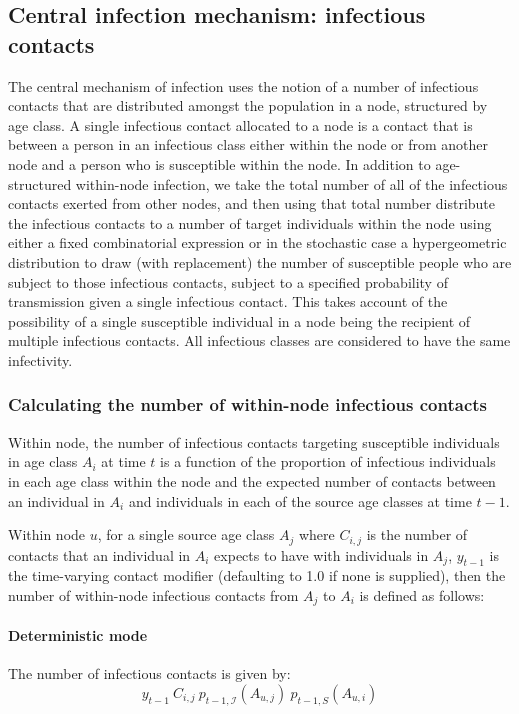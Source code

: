 \documentclass[11pt]{article}
\begin{document}
\subsection{Central infection mechanism: infectious contacts }

The central mechanism of infection uses the notion of a number of infectious contacts that are distributed amongst the population in a node, structured by age class.  A single infectious contact allocated to a node is a contact that is between a person in an infectious class either within the node or from another node and a person who is susceptible within the node.  In addition to age-structured within-node infection, we take the total number of all of the infectious contacts exerted from other nodes, and then using that total number distribute the infectious contacts to a number of target individuals within the node using either a fixed combinatorial expression or in the stochastic case a hypergeometric distribution to draw (with replacement) the number of susceptible people who are subject to those infectious contacts, subject to a specified probability of transmission given a single infectious contact.  This takes account of the possibility of a single susceptible individual in a node being the recipient of multiple infectious contacts.   All infectious classes are considered to have the same infectivity.  

\subsubsection{Calculating the number of within-node infectious contacts}

Within node, the number of infectious contacts targeting susceptible individuals in age class $A_i$ at time $t$ is a function of the proportion of infectious individuals in each age class within the node and the expected number of contacts between an individual in $A_i$ and individuals in each of the source age classes at time $t-1$. 

Within node $u$, for a single source age class $A_j$ where $C_{i,j}$ is the number of contacts that an individual in $A_i$ expects to have with individuals in $A_j$, $y_{t-1}$ is the time-varying contact modifier (defaulting to 1.0 if none is supplied), then the number of within-node infectious contacts from $A_j$ to $A_i$ is defined as follows:

\paragraph{Deterministic mode}\hfill \break
The number of infectious contacts is given by:
$$y_{t-1}~C_{i,j}~p_{t-1, \mathcal{I}}(A_{u,j})~ p_{t-1, S}(A_{u,i})$$
\end{document}
